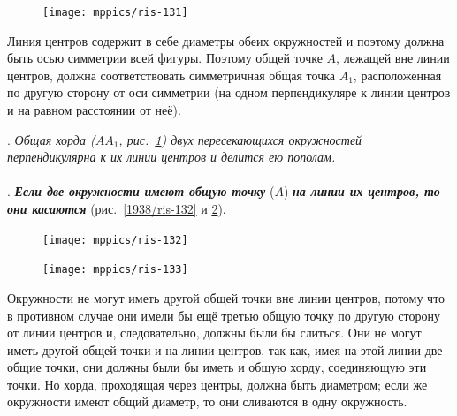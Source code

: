 \documentclass[twoside]{book}
\begin{document}
\begin{figure}[h!]
\centering
\texttt{[image: mppics/ris-131]}
\caption{}\label{1938/ris-131}
\end{figure}

Линия центров содержит в себе диаметры обеих окружностей и поэтому должна быть осью симметрии всей фигуры.
Поэтому общей точке $A$, лежащей вне линии центров, должна соответствовать симметричная общая точка $A_1$, расположенная по другую сторону от оси симметрии 
(на одном перпендикуляре к линии центров и на равном расстоянии от неё). 

\medskip

\smallskip
{}.
\emph{Общая хорда \emph{($AA_1$, рис.~\ref{1938/ris-131})} двух пересекающихся окружностей перпендикулярна к их линии центров и делится ею пополам.}

\paragraph{}\label{1938/119}
.
\textbf{\emph{Если две окружности имеют общую точку}} ($A$) \textbf{\emph{на линии их центров, то они касаются}} (рис.~\ref{1938/ris-132} и \ref{1938/ris-133}).

\begin{figure}[h!]
\begin{minipage}{.55\textwidth}
\centering
\texttt{[image: mppics/ris-132]}
\end{minipage}
\hfill
\begin{minipage}{.41\textwidth}
\centering
\texttt{[image: mppics/ris-133]}
\end{minipage}

\medskip

\begin{minipage}{.55\textwidth}
\centering
\caption{}\label{1938/ris-132}
\end{minipage}
\hfill
\begin{minipage}{.41\textwidth}
\centering
\caption{}\label{1938/ris-133}
\end{minipage}
\vskip-4mm
\end{figure}


Окружности не могут иметь другой общей точки вне линии центров, потому что в противном случае они имели бы ещё третью общую точку по другую сторону от линии центров и, следовательно, должны были бы слиться.
Они не могут иметь другой общей точки и на линии центров, так как, имея на этой линии две общие точки, они должны были бы иметь и общую хорду, соединяющую эти точки.
Но хорда, проходящая через центры, должна быть диаметром;
если же окружности имеют общий диаметр, то они сливаются в одну окружность.
\end{document}
